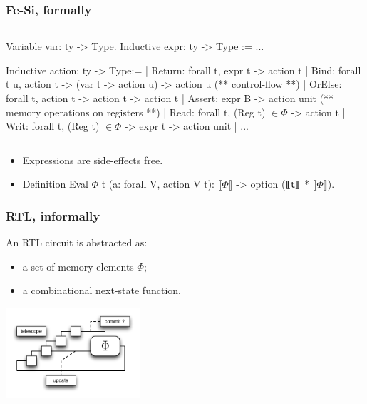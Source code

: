 \documentclass[9pt]{beamer}
\newcommand\denote[1]{\llbracket #1 \rrbracket}
\newcommand\fesi{Fe-Si}
\begin{document}
\begin{frame}[fragile]
  \frametitle{\fesi{}, formally}
  \begin{columns}

\begin{coq}
Variable var: ty -> Type. 
Inductive expr: ty -> Type := ...

Inductive action: ty -> Type:=
| Return: forall t, expr t -> action t
| Bind: forall t u,  action  t -> (var t -> action u) -> action u
(** control-flow **)
| OrElse: forall t, action t -> action t -> action t
| Assert: expr B -> action unit    
(** memory operations on registers **)
| Read: forall t, (Reg t) $\in \Phi$ -> action t
| Writ: forall t, (Reg t) $\in \Phi$ -> expr t -> action unit
| ... 
\end{coq}
    \end{columns}
\begin{itemize}
\item Expressions are side-effects free. 
\item \vspace{-.5em}
  \begin{coq}
Definition Eval $\Phi$ t (a: forall V, action V t): $\denote\Phi$ -> option ($\denote{\tt t}$ * $\denote\Phi$).
\end{coq}
\end{itemize}

\end{frame}
\begin{frame}[fragile]
  \frametitle{RTL, informally}
  
  An RTL circuit is abstracted as:
  \begin{itemize}
  \item a set of memory elements $\Phi$;
  \item a combinational next-state function.
  \end{itemize}
  
  \begin{center}
    \includegraphics[width=5cm]{figs/rtl.pdf}  
  \end{center}

\end{frame}
\end{document}
